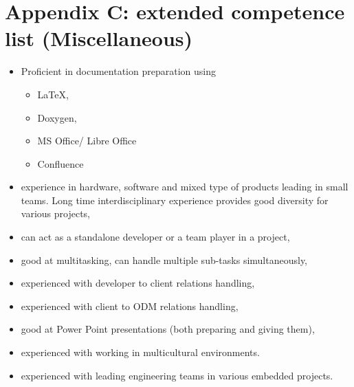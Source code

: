 \documentclass{tccv}
\begin{document}
\clearpage

\section{Appendix C: extended competence list (Miscellaneous)}

\begin{itemize}
	\item Proficient in documentation preparation using 
	\begin{itemize}
		\item \LaTeX, 
		\item Doxygen,
		\item MS Office/ Libre Office
		\item Confluence
	\end{itemize}
	\item experience in hardware, software and mixed type of products leading in small teams. Long time interdisciplinary experience provides good diversity for various projects,
	\item can act as a standalone developer or a team player in a project,
	\item good at multitasking, can handle multiple sub-tasks simultaneously,
	\item experienced with developer to client relations handling,
	\item experienced with client to ODM relations handling,
	\item good at Power Point presentations (both preparing and giving them),
	\item experienced with working in multicultural environments.
	\item experienced with leading engineering teams in various embedded projects.
	 
\end{itemize}
\end{document}
